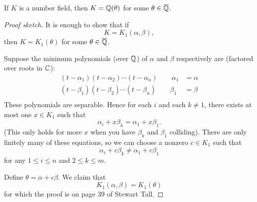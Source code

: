 \begin{theorem}
    If $K$ is a number field, then $K = \mathbb Q(\theta)$ for some $\theta\in\overline{\mathbb Q}$.
\end{theorem}
\begin{proof}[Proof sketch]
    It is enough to show that if
    \[K = K_1(\alpha, \beta), \]
    then $K = K_1(\theta)$ for some $\theta\in\overline{\mathbb Q}$.

    Suppose the minimum polynomials (over $\mathbb Q$) of $\alpha$ and $\beta$ respectively are (factored over roots in $\mathbb C$):
    \begin{align*}
        (t-\alpha_1)(t-\alpha_2)\cdots (t-\alpha_n)\qquad \alpha_1 & = \alpha \\
        (t-\beta_1)(t-\beta_2)\cdots (t-\beta_n)\qquad \beta_1     & = \beta  \\
    \end{align*}
    These polynomials are separable. Hence for each $i$ and each $k\neq 1$, there exists at most one $x\in K_1$ such that 
    \[\alpha_i + x\beta_k = \alpha_1 + x\beta_1.\]
    (This only holds for more $x$ when you have $\beta_k$ and $\beta_1$ colliding). There are only finitely many of these equations, so we can choose a nonzero $c\in K_1$ such that 
    \[\alpha_i + c\beta_k \neq \alpha_1 + c\beta_1\]
    for any $1\leq i\leq n$ and $2\leq k\leq m$. 

    Define $\theta = \alpha + c\beta$. We claim that 
    \[K_1(\alpha, \beta) = K_1(\theta)\]
    for which the proof is on page 39 of Stewart Tall. 
\end{proof}